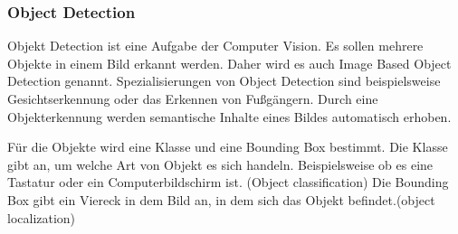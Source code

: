%
%
%
%
%

%
%
%
%




\subsubsection{Object Detection}

Objekt Detection ist eine Aufgabe der Computer Vision. Es sollen mehrere Objekte in einem Bild erkannt werden. Daher wird es auch Image Based Object Detection genannt.
Spezialisierungen von Object Detection sind beispielsweise Gesichtserkennung oder das Erkennen von Fußgängern. Durch eine Objekterkennung werden semantische Inhalte eines Bildes automatisch erhoben. 

Für die Objekte wird eine Klasse und eine Bounding Box bestimmt. 
Die Klasse gibt an, um welche Art von Objekt es sich handeln. Beispielsweise ob es eine Tastatur oder ein Computerbildschirm ist. (Object classification)
Die Bounding Box gibt ein Viereck in dem Bild an, in dem sich das Objekt befindet.(object localization)

